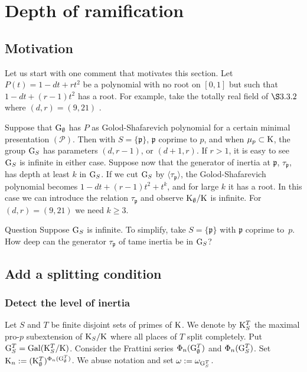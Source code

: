 \documentclass[12pt,a4paper,twoside,english]{smfart}
\def\p{{\mathfrak p}}
\def\G{{\rm G}}
\def\K{{\rm K}}
\def\PP{{\mathcal P}}
\def\Gal{{\rm Gal}}
\newenvironment{Question}{\begin{enonce}{Question}}{\end{enonce}}
\begin{document}
 
 
 


\section{Depth  of ramification}




\subsection{Motivation} 
Let us start with one comment that  motivates this section.
Let $P(t)=1-dt+rt^2$ be a polynomial  with no root on $[0,1]$ but such that 
$1-dt+(r-1)t^2$ has a root. For example, take the totally real field of $\S 3.3.2$ where $(d,r)=(9,21)$ .

\medskip

Suppose that $\G_\emptyset$ has $P$ as Golod-Shafarevich polynomial for a certain minimal presentation $(\PP)$. Then with $S=\{\p\}$, $\p$ coprime to $p$, and when $\mu_p \subset \K$, the group $\G_S$ has parameters $(d,r-1)$, or $(d+1,r)$. If $r>1$, it is easy to see  $\G_S$ is infinite in either case.
Suppose now that 
 the generator of  inertia  at $\p$, $\tau_\p$, has   depth at least $k$ in $\G_S$. If we cut $\G_S$ by $\langle \tau_\p \rangle$, the 
 Golod-Shafarevich polynomial becomes $1-dt+(r-1)t^2+t^{k}$, and for large $k$  it has a root.  In this case we can introduce the relation
 $\tau_\p$ and observe $\K_\emptyset/\K$ is infinite. 
 For  $(d,r)=(9,21)$ we need $k \geq 3$.



\begin{Question} Suppose $\G_S$ is infinite.
To simplify, take $S=\{\p\}$ with $\p$ coprime to~$p$. How deep can the generator $\tau_\p$  of tame inertia be in $\G_S$?
\end{Question}





\subsection{Add a splitting condition}
\subsubsection{Detect the level of inertia}
Let $S$ and $T$ be finite disjoint sets of primes of $\K$. We denote by 
$\K_S^T$ the maximal pro-$p$ subextension of $\K_S/\K$ where all places of $T$ split completely. Put $\G_S^T=\Gal(\K_S^T/\K)$. 
Consider the Frattini series $\Phi_n(\G_\emptyset^T)$ and $\Phi_n(\G_S^T)$. Set $\K_n:=(\K_\emptyset^T)^{\Phi_n(\G_\emptyset^T)}$.
We abuse notation and set $\omega:=\omega_{\G_S^T}$.
\end{document}

